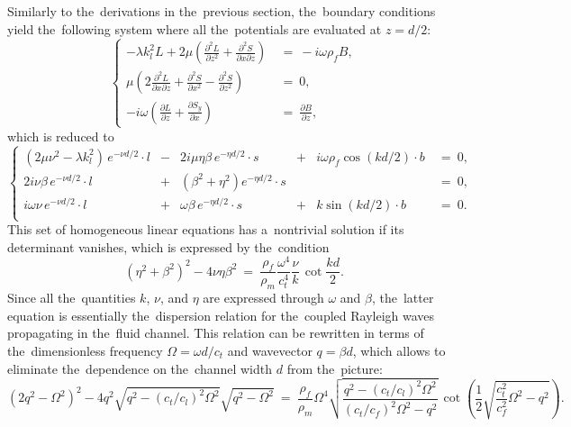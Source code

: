 Similarly to the~derivations in the~previous section, the~boundary conditions yield the~following system where all the~potentials are evaluated at $z=d/2$:
\begin{equation}
\left\{\begin{aligned}
-\lambda k_l^2 L +2\mu\left(\frac{\partial^2 L}{\partial z^2}+\frac{\partial^2 S}{\partial x \partial z}\right)~&=~-i\omega\rho_f B, \\
\mu\left(2\frac{\partial^2 L}{\partial x \partial z}+\frac{\partial^2 S}{\partial x^2}-\frac{\partial^2 S}{\partial z^2}\right)~&=~0, \\
-i\omega\left(\frac{\partial L}{\partial z} + \frac{\partial S_y}{\partial x}\right)~&=~\frac{\partial B}{\partial z},
\end{aligned}\right.
\end{equation}
which is reduced to
\begin{equation}
\label{eq:coeffRelationsRayleigh}
\left\{
\begin{array}{rrrrrr}
\left(2\mu\nu^2-\lambda k_l^2\right)\,e^{-\nu d/2}\cdot l &-& 2i\mu \eta \beta\,e^{-\eta d/2}\cdot s &+& i\omega\rho_f \cos(k d/2)\cdot b~&=~0, \\
2i\nu \beta \,e^{-\nu d/2}\cdot l &+& \left(\beta^2 +\eta^2 \right)e^{-\eta d/2} \cdot s &&~&=~0, \\
i\omega\nu \,e^{-\nu d/2}\cdot l &+& \omega\beta \,e^{-\eta d/2}\cdot s &+& k \sin(k d/2)\cdot b~&=~0. \\
\end{array}
\right.
\end{equation}
This set of homogeneous linear equations has a~nontrivial solution if its determinant vanishes, which is expressed by the~condition
\begin{equation}
\label{eq:dispersionkRayleigh}
\left(\eta^2+\beta^2\right)^2-4\nu\eta\beta^2~=~\frac{\rho_f}{\rho_m}\frac{\omega^4}{c_t^4}\frac{\nu}{k}\,\cot \frac{kd}{2}.
\end{equation}
Since all the~quantities $k$, $\nu$, and $\eta$ are expressed through $\omega$ and $\beta$, the~latter equation is essentially the~dispersion relation for the~coupled Rayleigh waves propagating in the~fluid channel.
This relation can be rewritten in terms of the~dimensionless frequency $\Omega = \omega d/c_t$ and wavevector $q = \beta d$, which allows to eliminate the~dependence on the~channel width $d$ from the~picture:
\begin{equation}
\label{eq:dispersionqRayleigh}
\left(2 q^2-\Omega^2\right)^2 - 4 q^2 \sqrt{q^2 - (c_t/c_l)^2 \Omega^2} \sqrt{q^2 - \Omega^2} 
~=~ \frac{\rho_f}{\rho_m}\Omega^4 \sqrt{\frac{q^2 - (c_t/c_l)^2 \Omega^2}{(c_t/c_f)^2 \Omega^2 - q^2}}\,\cot\left( \frac{1}{2}\sqrt{\frac{c_t^2}{c_f^2} \Omega^2 - q^2}\right).
\end{equation}
